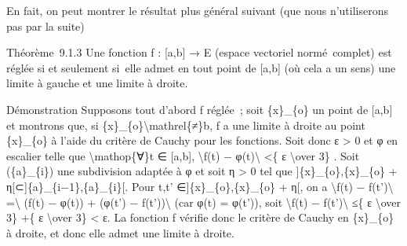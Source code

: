 \documentclass[]{article}
\begin{document}
En fait, on peut montrer le résultat plus général suivant (que nous
n'utiliserons pas par la suite)

Théorème~9.1.3 Une fonction f : {[}a,b{]} → E (espace vectoriel
normé~complet) est réglée si et seulement si~elle admet en tout point de
{[}a,b{]} (où cela a un sens) une limite à gauche et une limite à
droite.

Démonstration Supposons tout d'abord f réglée~; soit \{x\}\_\{o\} un
point de {[}a,b{]} et montrons que, si
\{x\}\_\{o\}\textbackslash{}mathrel\{≠\}b, f a une limite à droite au
point \{x\}\_\{o\} à l'aide du critère de Cauchy pour les fonctions.
Soit donc ε \textgreater{} 0 et φ en escalier telle que
\textbackslash{}mathop\{∀\}t ∈ {[}a,b{]}, \textbackslash{}\textbar{}f(t)
− φ(t)\textbackslash{}\textbar{} \textless{}\{ ε \textbackslash{}over
3\} . Soit (\{a\}\_\{i\}) une subdivision adaptée à φ et soit η
\textgreater{} 0 tel que {]}\{x\}\_\{o\},\{x\}\_\{o\} +
η{[}⊂{]}\{a\}\_\{i−1\},\{a\}\_\{i\}{[}. Pour t,t'
∈{]}\{x\}\_\{o\},\{x\}\_\{o\} + η{[}, on a
\textbackslash{}\textbar{}f(t) − f(t')\textbackslash{}\textbar{}
=\textbackslash{}\textbar{} (f(t) − φ(t)) + (φ(t') −
f(t'))\textbackslash{}\textbar{} (car φ(t) = φ(t')), soit
\textbackslash{}\textbar{}f(t) − f(t')\textbackslash{}\textbar{} ≤\{ ε
\textbackslash{}over 3\} +\{ ε \textbackslash{}over 3\} \textless{} ε.
La fonction f vérifie donc le critère de Cauchy en \{x\}\_\{o\} à
droite, et donc elle admet une limite à droite.
\end{document}
